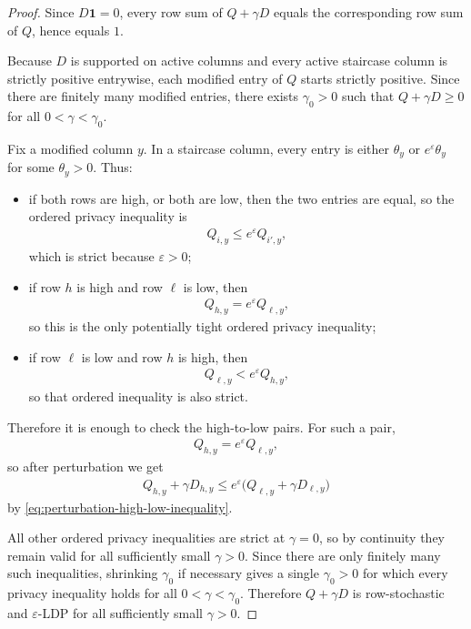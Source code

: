 \documentclass{article}
\theoremstyle{plain}
\theoremstyle{definition}
\theoremstyle{plain}
\begin{document}
\begin{proof}
Since $D\mathbf{1}=0$, every row sum of $Q+\gamma D$ equals the corresponding row sum of $Q$, hence equals $1$.

Because $D$ is supported on active columns and every active staircase column is strictly positive entrywise, each modified entry of $Q$ starts strictly positive. Since there are finitely many modified entries, there exists $\gamma_0>0$ such that $Q+\gamma D\ge 0$ for all $0<\gamma<\gamma_0$.

Fix a modified column $y$. In a staircase column, every entry is either $\theta_y$ or $e^\varepsilon\theta_y$ for some $\theta_y>0$. Thus:
\begin{itemize}
    \item if both rows are high, or both are low, then the two entries are equal, so the ordered privacy inequality is
    \begin{align*}
        Q_{i,y}\le e^\varepsilon Q_{i',y},
    \end{align*}
    which is strict because $\varepsilon>0$;
    \item if row $h$ is high and row $\ell$ is low, then
    \begin{align*}
        Q_{h,y}=e^\varepsilon Q_{\ell,y},
    \end{align*}
    so this is the only potentially tight ordered privacy inequality;
    \item if row $\ell$ is low and row $h$ is high, then
    \begin{align*}
        Q_{\ell,y}<e^\varepsilon Q_{h,y},
    \end{align*}
    so that ordered inequality is also strict.
    \end{itemize}
    Therefore it is enough to check the high-to-low pairs. For such a pair,
    \begin{align*}
    Q_{h,y}=e^\varepsilon Q_{\ell,y},
\end{align*}
so after perturbation we get
\begin{align*}
    Q_{h,y}+\gamma D_{h,y}\le e^\varepsilon\bigl(Q_{\ell,y}+\gamma D_{\ell,y}\bigr)
\end{align*}
by \eqref{eq:perturbation-high-low-inequality}.

All other ordered privacy inequalities are strict at $\gamma=0$, so by continuity they remain valid for all sufficiently small $\gamma>0$. Since there are only finitely many such inequalities, shrinking $\gamma_0$ if necessary gives a single $\gamma_0>0$ for which every privacy inequality holds for all $0<\gamma<\gamma_0$. Therefore $Q+\gamma D$ is row-stochastic and $\varepsilon$-LDP for all sufficiently small $\gamma>0$.
\end{proof}
\end{document}
